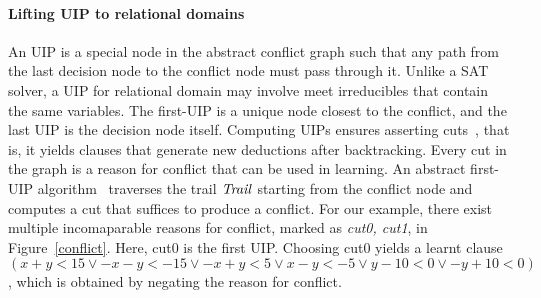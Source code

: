 \paragraph {\textbf{Lifting UIP to relational domains}}
An UIP is a special node in the abstract conflict graph such that 
any path from the last decision node to the conflict node must pass 
through it.  Unlike a SAT solver, a UIP for relational domain may 
involve meet irreducibles that contain the same variables.  The 
first-UIP is a unique node closest to the conflict, and the last UIP 
is the decision node itself.  Computing UIPs ensures asserting
cuts~\cite{cdcl,DBLP:journals/fmsd/BrainDGHK14}, that is, it 
yields clauses that generate new deductions after backtracking.  
Every cut in the graph is a reason for conflict that can be 
used in learning.  An abstract first-UIP algorithm~\cite{DBLP:journals/fmsd/BrainDGHK14} 
traverses the trail $\mathit{Trail}$ starting from the conflict node and 
computes a cut that suffices to produce a conflict. 
For our example, there exist multiple incomaparable reasons for conflict,
marked as {\em cut0, cut1}, in Figure~\ref{conflict}.  Here, cut0 is the first UIP.  
Choosing cut0 yields a learnt clause 
$(x+y<15 \vee -x-y<-15 \vee -x+y<5 \vee x-y<-5 \vee y-10<0 \vee -y+10<0)$, 
which is obtained by negating the reason for conflict.  
%    
